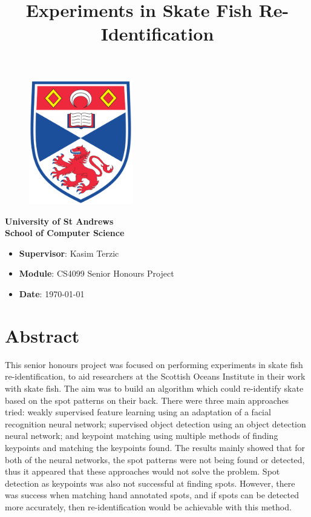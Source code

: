 \documentclass[a4paper]{article}
\title{Experiments in Skate Fish Re-Identification}
\author{}
\date{}
\begin{document}
\begin{titlepage}
	\vspace{\fill}
	\maketitle
	\begin{figure}[H]
		\centering
		\includegraphics[width=0.4\textwidth]{Images/SchoolLogo.png}
	\end{figure}
	\begin{center}
		\Large\textbf{University of St Andrews}\\
		\vspace{1cm}
		\Large\textbf{School of Computer Science}
	\end{center}

	\vspace{\fill}
    \Large%
    \begin{itemize}
    	\renewcommand\labelitemi{--}
        \item[] \textbf{Supervisor}: Kasim Terzic  
        \item[] \textbf{Module}: CS4099 Senior Honours Project
        \item[] \textbf{Date}: \today
	\end{itemize}
    \vspace{\fill}
\end{titlepage}
\section*{Abstract}
This senior honours project was focused on performing experiments in skate fish re-identification, to aid researchers at the Scottish Oceans Institute in their work with skate fish. The aim was to build an algorithm which could re-identify skate based on the spot patterns on their back. There were three main approaches tried: weakly supervised feature learning using an adaptation of a facial recognition neural network; supervised object detection using an object detection neural network; and keypoint matching using multiple methods of finding keypoints and matching the keypoints found. The results mainly showed that for both of the neural networks, the spot patterns were not being found or detected, thus it appeared that these approaches would not solve the problem. Spot detection as keypoints was also not successful at finding spots. However, there was success when matching hand annotated spots, and if spots can be detected more accurately, then re-identification would be achievable with this method.
\pagebreak
\end{document}

